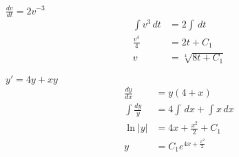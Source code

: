 \documentclass[12pt]{article}
\newenvironment{problem}[2][]{
    \begin{trivlist}
        \item[
            {\bfseries #1}
            {\bfseries #2.}
        ]
}{\end{trivlist}}
\newcommand{\dx}{\, dx}
\newcommand{\dt}{\, dt}
\begin{document}
\begin{problem}{30}
$\frac{dv}{dt} = 2v^{-3}$
\begin{align}
\int v^3 \dt &= 2 \int \dt \\
\frac{v^4}{4} &= 2t + C_1 \\
v &= \sqrt[4]{8t + C_1}
\end{align}
\end{problem}

\begin{problem}{31}
$y' = 4y + xy$
\begin{align}
\frac{dy}{dx} &= y \left(4 + x\right) \\
\int \frac{dy}{y} &= 4 \int \dx + \int x \dx \\
\ln\left|y\right| &= 4x + \frac{x^2}{2} + C_1 \\
y &= C_1e^{4x + \frac{x^2}{2}}
\end{align}
\end{problem}
\end{document}
